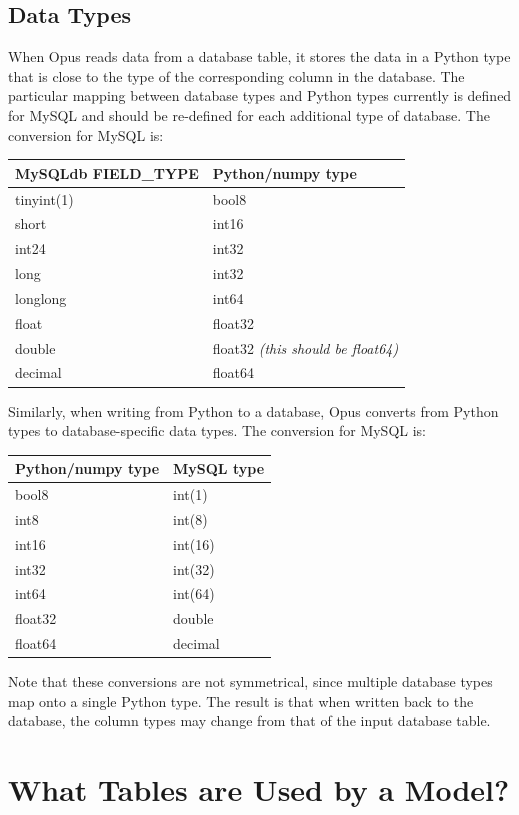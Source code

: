 \subsection{Data Types}

   When Opus reads data from a database table, it stores the
data in a Python type that is close to the type of the corresponding
column in the database.  The particular mapping between database
types and Python types currently is defined for MySQL \mysqlindex
and should be re-defined for each additional type of database.  The
conversion for MySQL is:

\begin{tabular}{ll}
MySQLdb FIELD_TYPE & Python/numpy type \\
\hline
tinyint(1) & bool8 \\
short & int16 \\
int24 & int32 \\
long & int32 \\
longlong & int64 \\
float & float32 \\
double & float32 \emph{(this should be float64)} \\
decimal & float64 \\
\end{tabular}

Similarly, when writing from Python to a database, Opus converts from Python
types to database-specific data types.  The conversion for MySQL is:

\begin{tabular}{ll}
Python/numpy type & MySQL type \\
\hline
bool8 & int(1) \\
int8 & int(8) \\
int16 & int(16) \\
int32 & int(32) \\
int64 & int(64) \\
float32 & double \\
float64 & decimal \\
\end{tabular}

Note that these conversions are not symmetrical, since multiple
database types map onto a single Python type.  The result is that
when written back to the database, the column types may change from
that of the input database table.

\section{What Tables are Used by a Model?}

